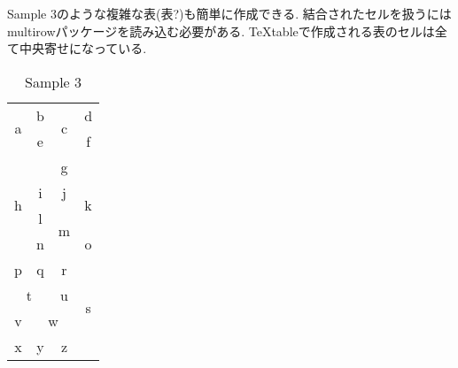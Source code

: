 \documentclass{jsarticle}
\begin{document}
\newpage
Sample 3のような複雑な表(表?)も簡単に作成できる.
結合されたセルを扱うにはmultirowパッケージを読み込む必要がある.
TeXtableで作成される表のセルは全て中央寄せになっている.
\vspace{-0.5em}
\begin{table}[htb]
	\captionsetup{labelformat=empty,labelsep=none}
	\caption{Sample 3}
	\label{sample3}
	\centering
	\begin{tabular}{|c|c|c|c|}\hline
		\multicolumn{1}{|c|}{\multirow{3}{*}{a}}	&b	&\multicolumn{1}{|c|}{\multirow{2}{*}{c}}	&d	\\ \cline{2-2}\cline{4-4}
		\multicolumn{1}{|c|}{}	&e	&\multicolumn{1}{|c|}{}	&f	\\ \cline{2-4}
		\multicolumn{1}{|c|}{}	&\multicolumn{3}{|c|}{\multirow{2}{*}{g}}	\\ \cline{1-1}
		\multicolumn{1}{|c|}{\multirow{4}{*}{h}}	&\multicolumn{3}{|c|}{}	\\ \cline{2-4}
		\multicolumn{1}{|c|}{}	&i	&j	&\multicolumn{1}{|c|}{\multirow{2}{*}{k}}	\\ \cline{2-3}
		\multicolumn{1}{|c|}{}	&l	&\multicolumn{1}{|c|}{\multirow{2}{*}{m}}	&\multicolumn{1}{|c|}{}	\\ \cline{2-2}\cline{4-4}
		\multicolumn{1}{|c|}{}	&n	&\multicolumn{1}{|c|}{}	&o	\\ \hline
		p	&q	&\multicolumn{1}{|c|}{\multirow{2}{*}{r}}	&\multicolumn{1}{|c|}{\multirow{5}{*}{s}}	\\ \cline{1-2}
		\multicolumn{2}{|c|}{\multirow{2}{*}{t}}	&\multicolumn{1}{|c|}{}	&\multicolumn{1}{|c|}{}	\\ \cline{3-3}
		\multicolumn{2}{|c|}{}	&u	&\multicolumn{1}{|c|}{}	\\ \cline{1-3}
		v	&\multicolumn{2}{|c|}{\multirow{1}{*}{w}}	&\multicolumn{1}{|c|}{}	\\ \cline{1-3}
		x	&y	&z	&\multicolumn{1}{|c|}{}	\\ \hline
	\end{tabular}
\end{table}
\end{document}

